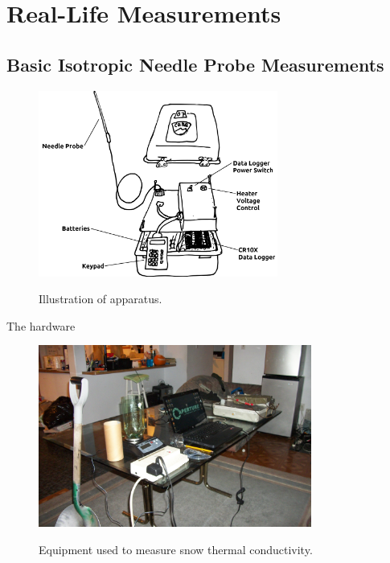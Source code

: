 \chapter{Real-Life Measurements}

\section{Basic Isotropic Needle Probe Measurements}

\begin{figure}[h]
\centering
\includegraphics[width=0.7\textwidth]{fig/apparatus.png}
\label{fig:apparatus}
\caption{Illustration of apparatus.}
\end{figure}

The hardware

\begin{figure}[h]
\centering
\includegraphics[width=0.8\textwidth]{fig/equipment.jpg}
\label{fig:equipment}
\caption{Equipment used to measure snow thermal conductivity.}
\end{figure}


